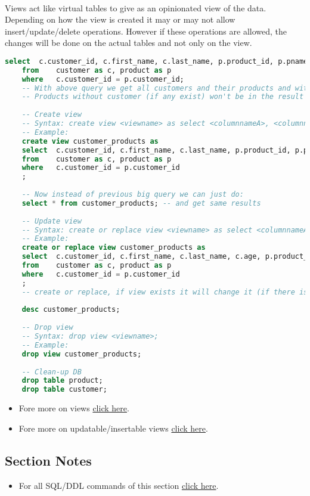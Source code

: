 \paragraph{} Views act like virtual tables to give as an opinionated view of the data. Depending on how the view is created it may or may not allow insert/update/delete operations. However if these operations are allowed, the changes will be done on the actual tables and not only on the view.
\begin{lstlisting}[language=SQL]
	select	c.customer_id, c.first_name, c.last_name, p.product_id, p.pname, p.pstatus
	from	customer as c, product as p
	where	c.customer_id = p.customer_id;
	-- With above query we get all customers and their products and with specified columns
	-- Products without customer (if any exist) won't be in the result set
	
	-- Create view
	-- Syntax: create view <viewname> as select <columnnameA>, <columnnameB>, .... from <tablenamea>, <tablenameb>, .... WHERE <conditions>;
	-- Example:
	create view customer_products as
	select	c.customer_id, c.first_name, c.last_name, p.product_id, p.pname, p.pstatus
	from	customer as c, product as p
	where	c.customer_id = p.customer_id
	;
	
	-- Now instead of previous big query we can just do:
	select * from customer_products; -- and get same results
	
	-- Update view
	-- Syntax: create or replace view <viewname> as select <columnnameA>, <columnnameB>, .... from <tablenamea>, <tablenameb>, .... WHERE <conditions>;
	-- Example:
	create or replace view customer_products as
	select	c.customer_id, c.first_name, c.last_name, c.age, p.product_id, p.pname, p.pstatus
	from	customer as c, product as p
	where	c.customer_id = p.customer_id
	;
	-- create or replace, if view exists it will change it (if there is anything different) or create it if it doesn't exist
	
	desc customer_products;
	
	-- Drop view
	-- Syntax: drop view <viewname>;
	-- Example:
	drop view customer_products;
	
	-- Clean-up DB
	drop table product;
	drop table customer;
\end{lstlisting}
\begin{itemize}
	\item Fore more on views \href{https://dev.mysql.com/doc/refman/8.0/en/views.html}{click here}.
	\item Fore more on updatable/insertable views \href{https://dev.mysql.com/doc/refman/8.0/en/view-updatability.html}{click here}.
\end{itemize}
\subsection{Section Notes}
\begin{itemize}
	\item For all \acs{SQL}/\acs{DDL} commands of this section \href{file:./source-items/sql/2-sql-ddl.sql}{click here}.
\end{itemize}
